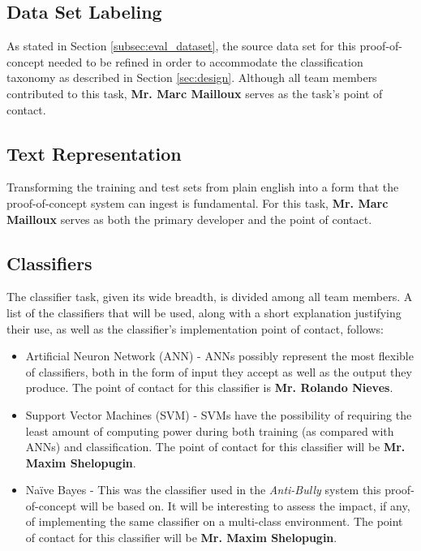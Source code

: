 \documentclass[conference]{sig-alternate-05-2015}
\begin{document}
\subsection{Data Set Labeling}\label{sec:labeling_task}
As stated in Section \ref{subsec:eval_dataset}, the source data set for this
proof-of-concept needed to be refined in order to accommodate the
classification taxonomy as described in Section \ref{sec:design}. Although all
team members contributed to this task, \textbf{Mr. Marc Mailloux} serves as the
task's point of contact.

\subsection{Text Representation}\label{sec:tokenization_task}
Transforming the training and test sets from plain english into a form that the
proof-of-concept system can ingest is fundamental. For this task,
\textbf{Mr. Marc Mailloux} serves as both the primary developer and the
point of contact.

\subsection{Classifiers}\label{sec:classifier_task}
The classifier task, given its wide breadth, is divided among all team
members. A list of the classifiers that will be used, along with a short
explanation justifying their use, as well as the classifier's implementation
point of contact, follows:
\begin{itemize}
  \item Artificial Neuron Network (ANN) - ANNs possibly represent
  the most flexible of classifiers, both in the form of input they accept as
  well as the output they produce. The point of contact for this classifier is
  \textbf{Mr. Rolando Nieves}.
  \item Support Vector Machines (SVM) - SVMs have the possibility of requiring
  the least amount of computing power during both training (as compared with
  ANNs) and classification. The point of contact for this classifier will be
  \textbf{Mr. Maxim Shelopugin}.
  \item Na\"{i}ve Bayes - This was the classifier used in the \textit{Anti-Bully}
  system this proof-of-concept will be based on. It will be interesting to
  assess the impact, if any, of implementing the same classifier on a
  multi-class environment. The point of contact for this classifier will be
  \textbf{Mr. Maxim Shelopugin}.
\end{itemize}
\end{document}
